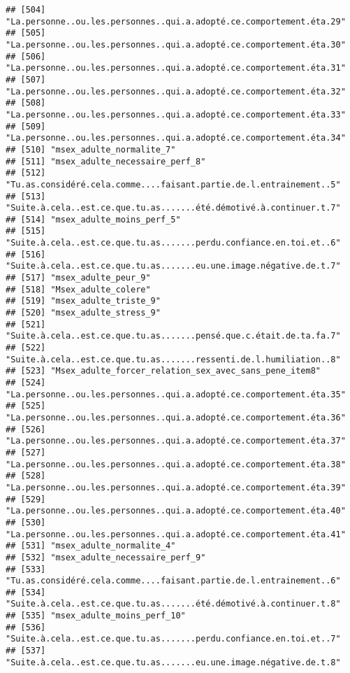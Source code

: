 \documentclass[
]{article}
\begin{document}
\begin{verbatim}
## [504] "La.personne..ou.les.personnes..qui.a.adopté.ce.comportement.éta.29"
## [505] "La.personne..ou.les.personnes..qui.a.adopté.ce.comportement.éta.30"
## [506] "La.personne..ou.les.personnes..qui.a.adopté.ce.comportement.éta.31"
## [507] "La.personne..ou.les.personnes..qui.a.adopté.ce.comportement.éta.32"
## [508] "La.personne..ou.les.personnes..qui.a.adopté.ce.comportement.éta.33"
## [509] "La.personne..ou.les.personnes..qui.a.adopté.ce.comportement.éta.34"
## [510] "msex_adulte_normalite_7"                                           
## [511] "msex_adulte_necessaire_perf_8"                                     
## [512] "Tu.as.considéré.cela.comme....faisant.partie.de.l.entrainement..5" 
## [513] "Suite.à.cela..est.ce.que.tu.as.......été.démotivé.à.continuer.t.7" 
## [514] "msex_adulte_moins_perf_5"                                          
## [515] "Suite.à.cela..est.ce.que.tu.as.......perdu.confiance.en.toi.et..6" 
## [516] "Suite.à.cela..est.ce.que.tu.as.......eu.une.image.négative.de.t.7" 
## [517] "msex_adulte_peur_9"                                                
## [518] "Msex_adulte_colere"                                                
## [519] "msex_adulte_triste_9"                                              
## [520] "msex_adulte_stress_9"                                              
## [521] "Suite.à.cela..est.ce.que.tu.as.......pensé.que.c.était.de.ta.fa.7" 
## [522] "Suite.à.cela..est.ce.que.tu.as.......ressenti.de.l.humiliation..8" 
## [523] "Msex_adulte_forcer_relation_sex_avec_sans_pene_item8"              
## [524] "La.personne..ou.les.personnes..qui.a.adopté.ce.comportement.éta.35"
## [525] "La.personne..ou.les.personnes..qui.a.adopté.ce.comportement.éta.36"
## [526] "La.personne..ou.les.personnes..qui.a.adopté.ce.comportement.éta.37"
## [527] "La.personne..ou.les.personnes..qui.a.adopté.ce.comportement.éta.38"
## [528] "La.personne..ou.les.personnes..qui.a.adopté.ce.comportement.éta.39"
## [529] "La.personne..ou.les.personnes..qui.a.adopté.ce.comportement.éta.40"
## [530] "La.personne..ou.les.personnes..qui.a.adopté.ce.comportement.éta.41"
## [531] "msex_adulte_normalite_4"                                           
## [532] "msex_adulte_necessaire_perf_9"                                     
## [533] "Tu.as.considéré.cela.comme....faisant.partie.de.l.entrainement..6" 
## [534] "Suite.à.cela..est.ce.que.tu.as.......été.démotivé.à.continuer.t.8" 
## [535] "msex_adulte_moins_perf_10"                                         
## [536] "Suite.à.cela..est.ce.que.tu.as.......perdu.confiance.en.toi.et..7" 
## [537] "Suite.à.cela..est.ce.que.tu.as.......eu.une.image.négative.de.t.8" 

\end{verbatim}
\end{document}
